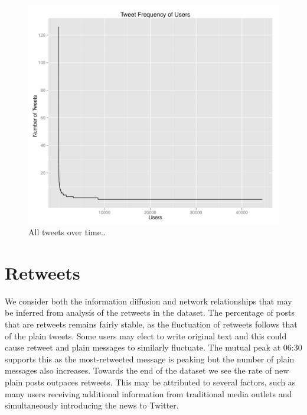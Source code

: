 \documentclass[a4paper, 11pt, titlepage]{article}
\begin{document}
\begin{figure}[h]
\centering
\label{fig:all_tweets_by_users}
\includegraphics[width=120mm]{../figures/all_tweets_by_users}
\caption{All tweets over time..}
\end{figure}

\section{Retweets}

We consider both the information diffusion and network relationships that may be inferred from analysis of the retweets in the dataset.  The percentage of posts that are retweets remains fairly stable, as the fluctuation of retweets follows that of the plain tweets.  Some users may elect to write original text and this could cause retweet and plain messages to similarly fluctuate.  The mutual peak at 06:30 supports this as the most-retweeted message is peaking but the number of plain messages also increases.  Towards the end of the dataset we see the rate of new plain posts outpaces retweets.  This may be attributed to several factors, such as many users receiving additional information from traditional media outlets and simultaneously introducing the news to Twitter.
\end{document}
